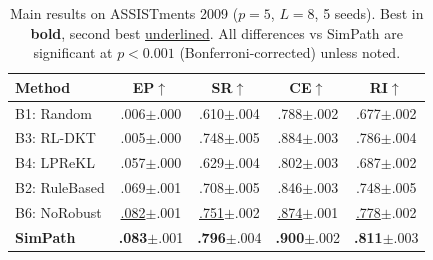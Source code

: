 \documentclass[runningheads]{llncs}
\begin{document}
\begin{table}[t]
\centering
\caption{Main results on ASSISTments 2009 ($p=5$, $L=8$, 5 seeds). Best in \textbf{bold}, second best \underline{underlined}. All differences vs SimPath are significant at $p<0.001$ (Bonferroni-corrected) unless noted.}
\label{tab:main_assist}
\begin{tabular}{lcccc}
\toprule
\textbf{Method} & \textbf{EP}$\uparrow$ & \textbf{SR}$\uparrow$ & \textbf{CE}$\uparrow$ & \textbf{RI}$\uparrow$ \\
\midrule
B1: Random         & .006{\scriptsize$\pm$.000} & .610{\scriptsize$\pm$.004} & .788{\scriptsize$\pm$.002} & .677{\scriptsize$\pm$.002} \\
B3: RL-DKT         & .005{\scriptsize$\pm$.000} & .748{\scriptsize$\pm$.005} & .884{\scriptsize$\pm$.003} & .786{\scriptsize$\pm$.004} \\
B4: LPReKL         & .057{\scriptsize$\pm$.000} & .629{\scriptsize$\pm$.004} & .802{\scriptsize$\pm$.003} & .687{\scriptsize$\pm$.002} \\
B2: RuleBased      & .069{\scriptsize$\pm$.001} & .708{\scriptsize$\pm$.005} & .846{\scriptsize$\pm$.003} & .748{\scriptsize$\pm$.005} \\
B6: NoRobust       & \underline{.082}{\scriptsize$\pm$.001} & \underline{.751}{\scriptsize$\pm$.002} & \underline{.874}{\scriptsize$\pm$.001} & \underline{.778}{\scriptsize$\pm$.002} \\
\midrule
\textbf{SimPath}   & \textbf{.083}{\scriptsize$\pm$.001} & \textbf{.796}{\scriptsize$\pm$.004} & \textbf{.900}{\scriptsize$\pm$.002} & \textbf{.811}{\scriptsize$\pm$.003} \\
\bottomrule
\end{tabular}
\end{table}
\end{document}
